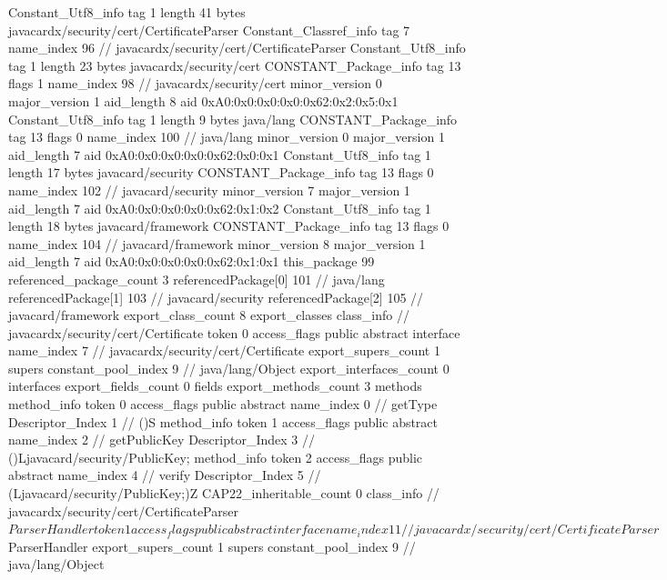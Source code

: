 {{{		}
		Constant_Utf8_info {
			tag	1
			length	41
			bytes	javacardx/security/cert/CertificateParser
		}
		Constant_Classref_info {
			tag	7
			name_index	96		// javacardx/security/cert/CertificateParser
		}
		Constant_Utf8_info {
			tag	1
			length	23
			bytes	javacardx/security/cert
		}
		CONSTANT_Package_info {
			tag	13
			flags	1
			name_index	98		// javacardx/security/cert
			minor_version	0
			major_version	1
			aid_length	8
			aid	0xA0:0x0:0x0:0x0:0x62:0x2:0x5:0x1
		}
		Constant_Utf8_info {
			tag	1
			length	9
			bytes	java/lang
		}
		CONSTANT_Package_info {
			tag	13
			flags	0
			name_index	100		// java/lang
			minor_version	0
			major_version	1
			aid_length	7
			aid	0xA0:0x0:0x0:0x0:0x62:0x0:0x1
		}
		Constant_Utf8_info {
			tag	1
			length	17
			bytes	javacard/security
		}
		CONSTANT_Package_info {
			tag	13
			flags	0
			name_index	102		// javacard/security
			minor_version	7
			major_version	1
			aid_length	7
			aid	0xA0:0x0:0x0:0x0:0x62:0x1:0x2
		}
		Constant_Utf8_info {
			tag	1
			length	18
			bytes	javacard/framework
		}
		CONSTANT_Package_info {
			tag	13
			flags	0
			name_index	104		// javacard/framework
			minor_version	8
			major_version	1
			aid_length	7
			aid	0xA0:0x0:0x0:0x0:0x62:0x1:0x1
		}
	}
	this_package	99
	referenced_package_count	3
	referencedPackage[0]	101		// java/lang
	referencedPackage[1]	103		// javacard/security
	referencedPackage[2]	105		// javacard/framework
	export_class_count	8
	export_classes {
		class_info {		// javacardx/security/cert/Certificate
			token	0
			access_flags	public abstract interface
			name_index	7		// javacardx/security/cert/Certificate
			export_supers_count	1
			supers {
				constant_pool_index	9		// java/lang/Object
			}
			export_interfaces_count	0
			interfaces {
			}
			export_fields_count	0
			fields {
			}
			export_methods_count	3
			methods {
				method_info {
					token	0
					access_flags	public abstract
					name_index	0		// getType
					Descriptor_Index	1		// ()S
				}
				method_info {
					token	1
					access_flags	public abstract
					name_index	2		// getPublicKey
					Descriptor_Index	3		// ()Ljavacard/security/PublicKey;
				}
				method_info {
					token	2
					access_flags	public abstract
					name_index	4		// verify
					Descriptor_Index	5		// (Ljavacard/security/PublicKey;)Z
				}
			}
			CAP22_inheritable_count	0
		}
		class_info {		// javacardx/security/cert/CertificateParser$ParserHandler
			token	1
			access_flags	public abstract interface
			name_index	11		// javacardx/security/cert/CertificateParser$ParserHandler
			export_supers_count	1
			supers {
				constant_pool_index	9		// java/lang/Object
}}}}
